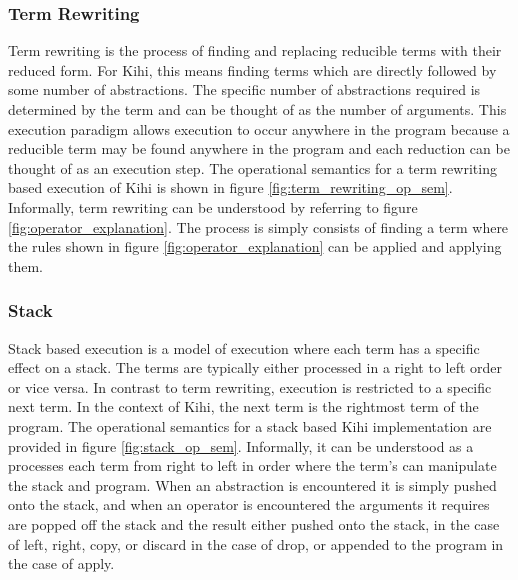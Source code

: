 \subsubsection{Term Rewriting}
Term rewriting is the process of finding
and replacing reducible terms with their reduced form. For Kihi,
this means finding terms which are directly followed by
some number of abstractions. The specific number of abstractions
required is determined by the term and can be thought of as the
number of arguments. This execution paradigm allows execution
to occur anywhere in the program because a reducible term may
be found anywhere in the program and each reduction can be
thought of as an execution step. The operational semantics for a term rewriting based execution of
Kihi is shown in figure \ref{fig:term_rewriting_op_sem}. Informally, term rewriting can be understood by referring to figure \ref{fig:operator_explanation}. The process is simply consists of finding a term where the rules shown in figure \ref{fig:operator_explanation} can be applied and applying them.

\subsubsection{Stack}
Stack based execution is a model of execution where each term has a specific effect on a stack. The terms are typically either processed in a right to left order or vice versa. In contrast to term rewriting, execution is restricted to a specific next term. In the context of Kihi, the next term is the rightmost term of the program. The operational semantics for a stack based Kihi implementation are provided in figure \ref{fig:stack_op_sem}. Informally, it can be understood as a processes each term from right to left in order where the term's can manipulate the stack and program. When an abstraction is encountered it is simply pushed onto the stack, and when an operator is encountered the arguments it requires are popped off the stack and the result either pushed onto the stack, in the case of left, right, copy, or discard in the case of drop, or appended to the program in the case of apply.




